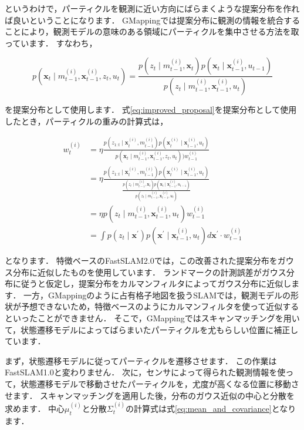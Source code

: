 \documentclass[{../../master}]{subfiles}
\begin{document}
というわけで，パーティクルを観測に近い方向にばらまくような提案分布を作れば良いということになります．
GMappingでは提案分布に観測の情報を統合することにより，観測モデルの意味のある領域にパーティクルを集中させる方法を取っています．
すなわち，

\begin{equation}
  p(\bm{x}_{t} \mid m_{t-1}^{(i)}, \bm{x}_{t-1}^{(i)}, z_{t}, u_{t})
  = \frac{p(z_{t} \mid m_{t-1}^{(i)}, \bm{x}_{t})p(\bm{x}_{t} \mid \bm{x}_{t-1}^{(i)}, u_{t-1})}{p(z_{t} \mid m_{t-1}^{(i)}, \bm{x}_{t-1}^{(i)}, u_{t})}
  \label{eq:improved_proposal}
\end{equation}

\noindent
を提案分布として使用します．
式\ref{eq:improved_proposal}を提案分布として使用したとき，パーティクルの重みの計算式は，

\begin{equation}
  \begin{split}
    w_{t}^{(i)} &= \eta \frac{p(z_{1:t} \mid \bm{x}_{t}^{(i)}, m_{t-1}^{(i)}) p(\bm{x}_{t}^{(i)} \mid \bm{x}_{t-1}^{(i)}, u_{t})}{p(\bm{x}_{t} \mid m_{t-1}^{(i)}, \bm{x}_{t-1}^{(i)}, z_{t}, u_{t})) w_{t-1}^{(i)}} \\
    &= \eta \frac{p(z_{1:t} \mid \bm{x}_{t}^{(i)}, m_{t-1}^{(i)}) p(\bm{x}_{t}^{(i)} \mid \bm{x}_{t-1}^{(i)}, u_{t})}{\frac{p(z_{t} \mid m_{t-1}^{(i)}, \bm{x}_{t})p(\bm{x}_{t} \mid \bm{x}_{t-1}^{(i)}, u_{t-1})}{p(z_{t} \mid m_{t-1}^{(i)}, \bm{x}_{t-1}^{(i)}, u_{t})}} \\
    &= \eta p(z_{t} \mid m_{t-1}^{(i)}, \bm{x}_{t-1}^{(i)}, u_{t})w_{t-1}^{(i)} \\
    &= \int p(z_{t} \mid \bm{x}^{\prime})p(\bm{x}^{\prime} \mid \bm{x}_{t-1}^{(i)}, u_{t})d\bm{x}^{\prime} \cdot w_{t-1}^{(i)}
  \end{split}
\end{equation}

\noindent
となります．
特徴ベースのFastSLAM2.0では，この改善された提案分布をガウス分布に近似したものを使用しています．
ランドマークの計測誤差がガウス分布に従うと仮定し，提案分布をカルマンフィルタによってガウス分布に近似します．
一方，GMappingのように占有格子地図を扱うSLAMでは，観測モデルの形状が予想できないため，特徴ベースのようにカルマンフィルタを使って近似するといったことができません．
そこで，GMappingではスキャンマッチングを用いて，状態遷移モデルによってばらまいたパーティクルを尤もらしい位置に補正しています．

まず，状態遷移モデルに従ってパーティクルを遷移させます．
この作業はFastSLAM1.0と変わりません．
次に，センサによって得られた観測情報を使って，状態遷移モデルで移動させたパーティクルを，尤度が高くなる位置に移動させます．
スキャンマッチングを適用した後，分布のガウス近似の中心と分散を求めます．
中心$\mu_{t}^{(i)}$と分散$\Sigma_{t}^{(i)}$の計算式は式\ref{eq:mean_and_covariance}となります．
\end{document}
